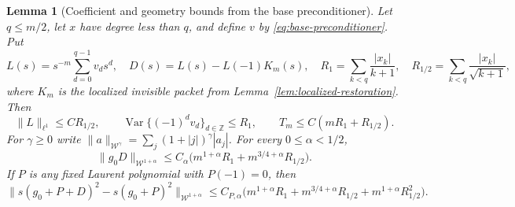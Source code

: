\documentclass[11pt]{article}
\newtheorem{lemma}[proposition]{Lemma}
\begin{document}
\begin{lemma}[Coefficient and geometry bounds from the base preconditioner]
\label{lem:preconditioned-restoration}
Let $q\le m/2$, let $x$ have degree less than $q$, and define $v$
by \eqref{eq:base-preconditioner}. Put
\[
 L(s)=s^{-m}\sum_{d=0}^{q-1}v_ds^d,\quad
 D(s)=L(s)-L(-1)K_m(s),\quad
 R_1=\sum_{k<q}\frac{|x_k|}{k+1},\quad
 R_{1/2}=\sum_{k<q}\frac{|x_k|}{\sqrt{k+1}},
\]
where $K_m$ is the localized invisible packet from
Lemma~\ref{lem:localized-restoration}. Then
\[
 \|L\|_{\ell^1}\le C R_{1/2},\qquad
 \operatorname{Var}\{(-1)^dv_d\}_{d\in\mathbb Z}\le R_1,
 \qquad T_m\le C(mR_1+R_{1/2}).
\]
For $\gamma\ge0$ write
$\|a\|_{\mathcal W^\gamma}=\sum_j(1+|j|)^\gamma|a_j|$.
For every $0\le\alpha<1/2$,
\begin{equation}\label{eq:preconditioned-weighted-restoration}
 \|g_0D\|_{\mathcal W^{1+\alpha}}
 \le C_\alpha\bigl(m^{1+\alpha}R_1
                    +m^{3/4+\alpha}R_{1/2}\bigr).
\end{equation}
If $P$ is any fixed Laurent polynomial with $P(-1)=0$, then
\[
 \|s(g_0+P+D)^2-s(g_0+P)^2\|_{\mathcal W^{1+\alpha}}
 \le C_{P,\alpha}\bigl(m^{1+\alpha}R_1
       +m^{3/4+\alpha}R_{1/2}+m^{1+\alpha}R_{1/2}^2\bigr).
\]
\end{lemma}
\end{document}
